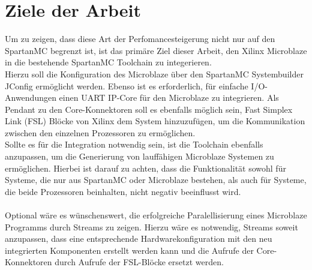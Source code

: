 \section{Ziele der Arbeit}
Um zu zeigen, dass diese Art der Perfomancesteigerung nicht nur auf den SpartanMC begrenzt ist, ist das primäre Ziel dieser Arbeit, den Xilinx Microblaze 
in die bestehende SpartanMC Toolchain zu integerieren.\\
Hierzu soll die Konfiguration des Microblaze über den SpartanMC Systembuilder JConfig ermöglicht werden. Ebenso ist es erforderlich, für einfache
I/O-Anwendungen einen UART IP-Core für den Microblaze zu integrieren. Als Pendant zu den Core-Konnektoren soll es ebenfalls möglich sein, Fast Simplex Link (FSL) Blöcke von Xilinx
dem System hinzuzufügen, um die Kommunikation zwischen den einzelnen Prozessoren zu ermöglichen.\\
Sollte es für die Integration notwendig sein, ist die Toolchain ebenfalls anzupassen, um die Generierung von lauffähigen Microblaze Systemen zu ermöglichen.
Hierbei ist darauf zu achten, dass die Funktionalität sowohl für Systeme, die nur aus SpartanMC oder Microblaze bestehen, als auch für Systeme, die beide Prozessoren beinhalten, 
nicht negativ beeinflusst wird.\\\\
Optional wäre es wünschenswert, die erfolgreiche Paralellisierung eines Microblaze Programms durch \textmu\/Streams zu zeigen. Hierzu wäre es notwendig, 
\textmu\/Streams soweit anzupassen, dass eine entsprechende Hardwarekonfiguration mit den neu integrierten Komponenten erstellt werden kann und
die Aufrufe der Core-Konnektoren durch Aufrufe der FSL-Blöcke ersetzt werden.

